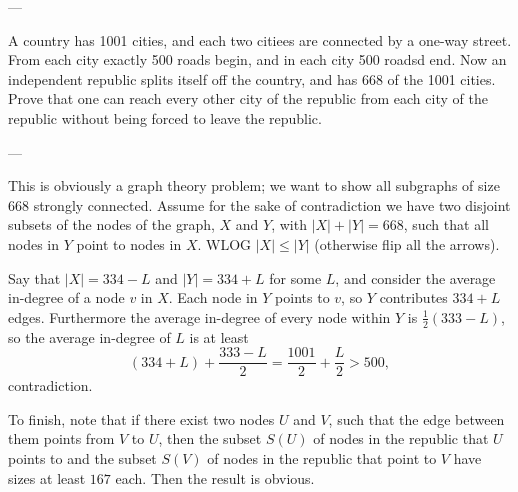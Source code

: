 
---

A country has 1001 cities, and each two citiees are connected by a one-way street. From each city exactly 500 roads begin, and in each city 500 roadsd end. Now an independent republic splits itself off the country, and has 668 of the 1001 cities. Prove that one can reach every other city of the republic from each city of the republic without being forced to leave the republic.

---

This is obviously a graph theory problem; we want to show all subgraphs of size $668$ strongly connected. Assume for the sake of contradiction we have two disjoint subsets of the nodes of the graph, $X$ and $Y$, with $|X|+|Y|=668$, such that all nodes in $Y$ point to nodes in $X$. WLOG $|X|\le|Y|$ (otherwise flip all the arrows).

Say that $|X|=334-L$ and $|Y|=334+L$ for some $L$, and consider the average in-degree of a node $v$ in $X$. Each node in $Y$ points to $v$, so $Y$ contributes $334+L$ edges. Furthermore the average in-degree of every node within $Y$ is $\tfrac12(333-L)$, so the average in-degree of $L$ is at least \[(334+L)+\frac{333-L}2=\frac{1001}2+\frac L2>500,\]
contradiction.

To finish, note that if there exist two nodes $U$ and $V$, such that the edge between them points from $V$ to $U$, then the subset $S(U)$ of nodes in the republic that $U$ points to and the subset $S(V)$ of nodes in the republic that point to $V$ have sizes at least $167$ each. Then the result is obvious.

